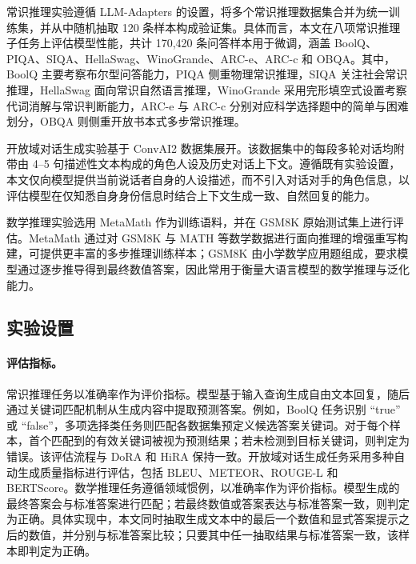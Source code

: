 \documentclass[UTF8,a4paper,11pt]{ctexart}
\begin{document}
常识推理实验遵循 LLM-Adapters\cite{hu2023llmadapters} 的设置，将多个常识推理数据集合并为统一训练集，并从中随机抽取 120 条样本构成验证集。具体而言，本文在八项常识推理子任务上评估模型性能，共计 170,420 条问答样本用于微调，涵盖 BoolQ\cite{bisk2019boolq}、PIQA\cite{bisk2020piqa}、SIQA\cite{sap2019socialiqa}、HellaSwag\cite{zellers2019hellaswag}、WinoGrande\cite{sakaguchi2021winogrande}、ARC-e、ARC-c\cite{clark2018arc} 和 OBQA\cite{mihaylov2018openbookqa}。其中，BoolQ 主要考察布尔型问答能力，PIQA 侧重物理常识推理，SIQA 关注社会常识推理，HellaSwag 面向常识自然语言推理，WinoGrande 采用完形填空式设置考察代词消解与常识判断能力，ARC-e 与 ARC-c 分别对应科学选择题中的简单与困难划分，OBQA 则侧重开放书本式多步常识推理。

开放域对话生成实验基于 ConvAI2\cite{dinan2019convai2} 数据集展开。该数据集中的每段多轮对话均附带由 4--5 句描述性文本构成的角色人设及历史对话上下文。遵循既有实验设置，本文仅向模型提供当前说话者自身的人设描述，而不引入对话对手的角色信息，以评估模型在仅知悉自身身份信息时结合上下文生成一致、自然回复的能力。

数学推理实验选用 MetaMath\cite{yu2024metamath} 作为训练语料，并在 GSM8K\cite{cobbe2021gsm8k} 原始测试集上进行评估。MetaMath 通过对 GSM8K 与 MATH 等数学数据进行面向推理的增强重写构建，可提供更丰富的多步推理训练样本；GSM8K 由小学数学应用题组成，要求模型通过逐步推导得到最终数值答案，因此常用于衡量大语言模型的数学推理与泛化能力。

\subsection{实验设置}

\paragraph{评估指标。}
常识推理任务以准确率作为评价指标。模型基于输入查询生成自由文本回复，随后通过关键词匹配机制从生成内容中提取预测答案。例如，BoolQ 任务识别 ``true'' 或 ``false''，多项选择类任务则匹配各数据集预定义候选答案关键词。对于每个样本，首个匹配到的有效关键词被视为预测结果；若未检测到目标关键词，则判定为错误。该评估流程与 DoRA 和 HiRA 保持一致。开放域对话生成任务采用多种自动生成质量指标进行评估，包括 BLEU\cite{papineni2002bleu}、METEOR\cite{banerjee2005meteor}、ROUGE-L\cite{lin2004rouge} 和 BERTScore\cite{zhang2019bertscore}。数学推理任务遵循领域惯例，以准确率作为评价指标。模型生成的最终答案会与标准答案进行匹配；若最终数值或答案表达与标准答案一致，则判定为正确。具体实现中，本文同时抽取生成文本中的最后一个数值和显式答案提示之后的数值，并分别与标准答案比较；只要其中任一抽取结果与标准答案一致，该样本即判定为正确。
\end{document}
